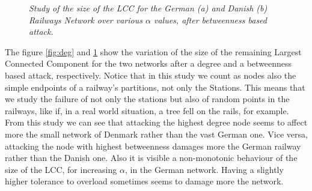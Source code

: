 \begin{figure}[h!t]
\centering


\caption{\textit{\small{Study of the size of the LCC for the  German (a) and Danish (b) Railways Network over various $\alpha$ values, after betweenness based attack.}}}
\label{fig:betw}
\end{figure}




The figure \ref{fig:deg} and \ref{fig:betw} show the variation of the size of the remaining Largest Connected Component for the two networks after a degree and a betweenness based attack, respectively. Notice that in this study we count as nodes also the simple endpoints of a railway's partitions, not only the Stations. This means that we study the failure of not only the stations but also of random points in the railways, like if, in a real world situation, a tree fell on the rails, for example. From this study we can see that attacking the highest degree node seems to affect more the small network of Denmark rather than the vast German one. Vice versa, attacking the node with highest betweenness damages more the German railway rather than the Danish one.
Also it is visible a non-monotonic behaviour of the size of the LCC, for increasing $\alpha$, in the German network. Having a slightly higher tolerance to overload sometimes seems to damage more the network. 


